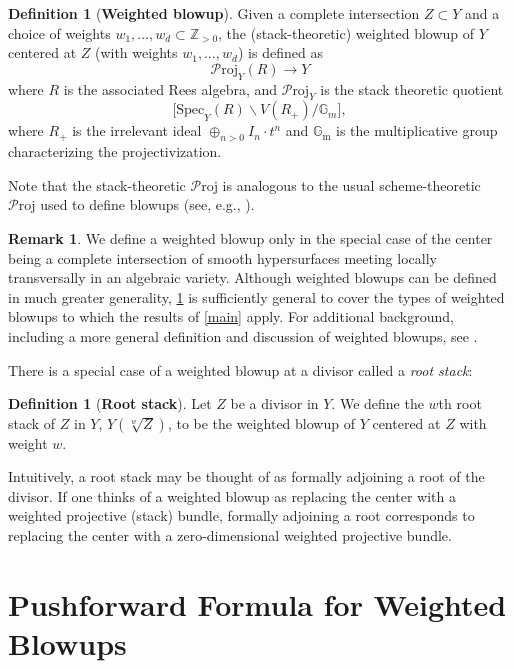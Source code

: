 \documentclass[11pt,oneside,english]{article}
\numberwithin{equation}{section}
\theoremstyle{definition}
\newtheorem{definition}[theorem]{Definition}
\newtheorem{remark}{Remark}[theorem]
\newcommand\G{\mathbb{G}}
\newcommand{\ra}{\rightarrow}
\begin{document}
\begin{definition}[\bf{Weighted blowup}] \label{def:weighted}
Given a complete intersection $Z \subset Y$ and a choice of weights $w_1, \dots, w_d \subset \mathbb Z_{>0}$, the (stack-theoretic) weighted blowup of $Y$ centered at $Z$ (with weights $w_1 , \dots, w_d$) is defined as  $$\mathscr P\text{roj}_Y(R) \ra Y$$ where $R$ is the associated Rees algebra, and $\mathscr P\text{roj}_Y$ is the stack theoretic quotient $$\text{[Spec}_Y(R) \smallsetminus V(R_+)/\G_m],$$
 where $R_+$ is the irrelevant ideal $\oplus_{n >0} I_n \cdot t^n$ and $\mathbb{G}_{\text{m}}$ is the multiplicative group characterizing the projectivization. 

 
\end{definition}
Note that the stack-theoretic $\mathscr P\text{roj}$ is analogous to the usual scheme-theoretic $\mathscr P\text{roj}$ used to define blowups (see, e.g., \cite[Appendix B]{fulton}).

\begin{remark}
We define a weighted blowup only in the special case of the center being a complete intersection of smooth hypersurfaces meeting locally transversally in an algebraic variety. Although weighted blowups can be defined in much greater generality, \cref{def:weighted} is sufficiently general to cover the types of weighted blowups to which the results of \cref{main} apply. For additional background, including a more general definition and discussion of weighted blowups, see \cite{weighted}. 
\end{remark}

There is a special case of a weighted blowup at a divisor called a \emph{root stack}: 

\begin{definition}[\bf{Root stack}]
    Let $Z$ be a divisor in $Y$. We define the $w$th root stack of $Z$ in $Y$, $Y(\sqrt[w]{Z})$, to be the weighted blowup of $Y$ centered at $Z$ with weight $w$. 
\end{definition}

Intuitively, a root stack may be thought of as formally adjoining a root of the divisor. If one thinks of a weighted blowup as replacing the center with a weighted projective (stack) bundle, formally adjoining a root corresponds to replacing the center with a zero-dimensional weighted projective bundle. 


\section{Pushforward Formula for Weighted Blowups}
\label{sec:push}
\end{document}
